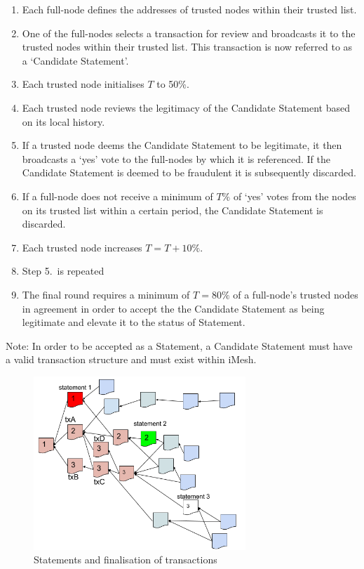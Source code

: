 \documentclass[a4paper,10pt,twocolumn]{article}
\begin{document}
	\vspace{-0.5\baselineskip}
	\begin{enumerate}
		\setlength\itemsep{0em}
		\item Each full-node defines the addresses of trusted nodes within their trusted list.
		\item One of the full-nodes selects a transaction for review and broadcasts it to the trusted nodes within their trusted list. 		This transaction is now referred to as a `Candidate Statement'.
		\item Each trusted node initialises \(T\) to 50\%.
		\item Each trusted node reviews the legitimacy of the Candidate Statement based on its local history.
		\item If a trusted node deems the Candidate Statement to be legitimate, it then broadcasts a `yes' vote to the full-nodes by which it is referenced. If the Candidate Statement is deemed to be fraudulent it is subsequently discarded.
		\item If a full-node does not receive a minimum of \(T\%\) of `yes' votes from the nodes on its trusted list within a certain period, the Candidate Statement is discarded.
		\item Each trusted node increases \(T=T+10\%\).
		\item Step 5.\ is repeated
		\item The final round requires a minimum of \(T=80\%\) of a full-node's trusted nodes in agreement in order to accept the the Candidate Statement as being legitimate and elevate it to the status of Statement.
	\end{enumerate}
	
	\vspace{1.5mm}
	
	Note: In order to be accepted as a Statement, a Candidate Statement must have a valid transaction structure and must exist within iMesh.
	
	\newpage
	
	 \begin{figure}[ht]
		\begin{center}
		\includegraphics[width=80mm]{fba.png}
		  \caption{Statements and finalisation of transactions}
		\label{fig:fba}
		\end{center}
	 \end{figure}
	
\end{document}
